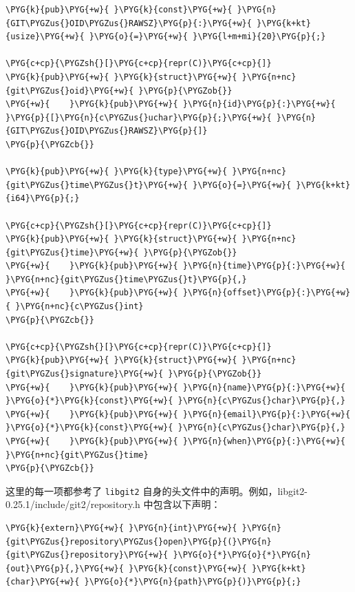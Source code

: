\begin{Verbatim}[commandchars=\\\{\},breaklines=true,breakanywhere=true,fontsize=\codefont,xleftmargin=17bp]
\PYG{k}{pub}\PYG{+w}{ }\PYG{k}{const}\PYG{+w}{ }\PYG{n}{GIT\PYGZus{}OID\PYGZus{}RAWSZ}\PYG{p}{:}\PYG{+w}{ }\PYG{k+kt}{usize}\PYG{+w}{ }\PYG{o}{=}\PYG{+w}{ }\PYG{l+m+mi}{20}\PYG{p}{;}

\PYG{c+cp}{\PYGZsh{}[}\PYG{c+cp}{repr(C)}\PYG{c+cp}{]}
\PYG{k}{pub}\PYG{+w}{ }\PYG{k}{struct}\PYG{+w}{ }\PYG{n+nc}{git\PYGZus{}oid}\PYG{+w}{ }\PYG{p}{\PYGZob{}}
\PYG{+w}{    }\PYG{k}{pub}\PYG{+w}{ }\PYG{n}{id}\PYG{p}{:}\PYG{+w}{ }\PYG{p}{[}\PYG{n}{c\PYGZus{}uchar}\PYG{p}{;}\PYG{+w}{ }\PYG{n}{GIT\PYGZus{}OID\PYGZus{}RAWSZ}\PYG{p}{]}
\PYG{p}{\PYGZcb{}}

\PYG{k}{pub}\PYG{+w}{ }\PYG{k}{type}\PYG{+w}{ }\PYG{n+nc}{git\PYGZus{}time\PYGZus{}t}\PYG{+w}{ }\PYG{o}{=}\PYG{+w}{ }\PYG{k+kt}{i64}\PYG{p}{;}

\PYG{c+cp}{\PYGZsh{}[}\PYG{c+cp}{repr(C)}\PYG{c+cp}{]}
\PYG{k}{pub}\PYG{+w}{ }\PYG{k}{struct}\PYG{+w}{ }\PYG{n+nc}{git\PYGZus{}time}\PYG{+w}{ }\PYG{p}{\PYGZob{}}
\PYG{+w}{    }\PYG{k}{pub}\PYG{+w}{ }\PYG{n}{time}\PYG{p}{:}\PYG{+w}{ }\PYG{n+nc}{git\PYGZus{}time\PYGZus{}t}\PYG{p}{,}
\PYG{+w}{    }\PYG{k}{pub}\PYG{+w}{ }\PYG{n}{offset}\PYG{p}{:}\PYG{+w}{ }\PYG{n+nc}{c\PYGZus{}int}
\PYG{p}{\PYGZcb{}}

\PYG{c+cp}{\PYGZsh{}[}\PYG{c+cp}{repr(C)}\PYG{c+cp}{]}
\PYG{k}{pub}\PYG{+w}{ }\PYG{k}{struct}\PYG{+w}{ }\PYG{n+nc}{git\PYGZus{}signature}\PYG{+w}{ }\PYG{p}{\PYGZob{}}
\PYG{+w}{    }\PYG{k}{pub}\PYG{+w}{ }\PYG{n}{name}\PYG{p}{:}\PYG{+w}{ }\PYG{o}{*}\PYG{k}{const}\PYG{+w}{ }\PYG{n}{c\PYGZus{}char}\PYG{p}{,}
\PYG{+w}{    }\PYG{k}{pub}\PYG{+w}{ }\PYG{n}{email}\PYG{p}{:}\PYG{+w}{ }\PYG{o}{*}\PYG{k}{const}\PYG{+w}{ }\PYG{n}{c\PYGZus{}char}\PYG{p}{,}
\PYG{+w}{    }\PYG{k}{pub}\PYG{+w}{ }\PYG{n}{when}\PYG{p}{:}\PYG{+w}{ }\PYG{n+nc}{git\PYGZus{}time}
\PYG{p}{\PYGZcb{}}
\end{Verbatim}

这里的每一项都参考了 \texttt{libgit2} 自身的头文件中的声明。例如，libgit2-0.25.1/\allowbreak{}include/\allowbreak{}git2/\allowbreak{}repository.h 中包含以下声明：

\begin{Verbatim}[commandchars=\\\{\},breaklines=true,breakanywhere=true,fontsize=\codefont,xleftmargin=17bp]
\PYG{k}{extern}\PYG{+w}{ }\PYG{n}{int}\PYG{+w}{ }\PYG{n}{git\PYGZus{}repository\PYGZus{}open}\PYG{p}{(}\PYG{n}{git\PYGZus{}repository}\PYG{+w}{ }\PYG{o}{*}\PYG{o}{*}\PYG{n}{out}\PYG{p}{,}\PYG{+w}{ }\PYG{k}{const}\PYG{+w}{ }\PYG{k+kt}{char}\PYG{+w}{ }\PYG{o}{*}\PYG{n}{path}\PYG{p}{)}\PYG{p}{;}
\end{Verbatim}

